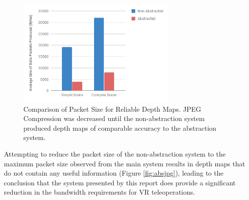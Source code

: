 \begin{figure}[H]
    \begin{center}
      \includegraphics[width=0.7\textwidth]{Figures/packetcomp.png}
      \caption[Comparison of Packet Size for Reliable Depth Maps]{Comparison of Packet Size for Reliable Depth Maps. JPEG Compression was decreased until the non-abstraction system produced depth maps of comparable accuracy to the abstraction system.}
      \label{fig:packetc}
    \end{center}
\end{figure}

Attempting to reduce the packet size of the non-abstraction system to the maximum packet size observed from the main system results in depth maps that do not contain any useful information (Figure \ref{fig:absjpg}), leading to the conclusion that the system presented by this report does provide a significant reduction in the bandwidth requirements for VR teleoperations.

